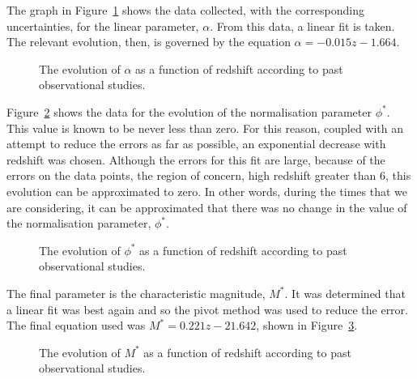 			The graph in Figure~\ref{fig:alpha_evolution} shows the data collected, with the corresponding uncertainties, for the linear parameter, $\alpha$. From this data, a linear fit is taken. The relevant evolution, then, is governed by the equation $\alpha = -0.015z - 1.664$.
			\begin{figure}[!htbp]
				\centering
					\begingroup{}
						\resizebox{0.6\textwidth}{!}{%
							
						}\endgroup
				\caption{The evolution of $\alpha$ as a function of redshift according to past observational studies.\label{fig:alpha_evolution}}
			\end{figure}

			Figure~\ref{fig:phi_evolution} shows the data for the evolution of the normalisation parameter $\phi^{*}$. This value is known to be never less than zero. For this reason, coupled with an attempt to reduce the errors as far as possible, an exponential decrease with redshift was chosen. Although the errors for this fit are large, because of the errors on the data points, the region of concern, high redshift greater than 6, this evolution can be approximated to zero. In other words, during the times that we are considering, it can be approximated that there was no change in the value of the normalisation parameter, $\phi^*$.
			\begin{figure}[!htbp]
				\centering
					\begingroup{}
						\resizebox{0.6\textwidth}{!}{%
							
						}\endgroup
				\caption{The evolution of $\phi^{*}$ as a function of redshift according to past observational studies.\label{fig:phi_evolution}}
			\end{figure}

			The final parameter is the characteristic magnitude, $M^*$. It was determined that a linear fit was best again and so the pivot method was used to reduce the error. The final equation used was $M^* = 0.221z - 21.642$, shown in Figure~\ref{fig:m-star_evolution}.
			\begin{figure}[!htbp]
				\centering
					\begingroup{}
						\resizebox{0.6\textwidth}{!}{%
							
						}\endgroup
				\caption{The evolution of $M^{*}$ as a function of redshift according to past observational studies.\label{fig:m-star_evolution}}
			\end{figure}

